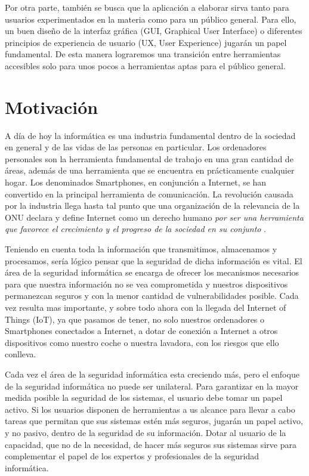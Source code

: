 Por otra parte, también se busca que la aplicación a elaborar sirva tanto para usuarios experimentados en la materia como para un público general. Para ello, un buen diseño de la interfaz gráfica (GUI, Graphical User Interface) o diferentes principios de experiencia de usuario (UX, User Experience) jugarán un papel fundamental. De esta manera lograremos una transición entre herramientas accesibles solo para unos pocos a herramientas aptas para el público general.

\section{Motivación}

A día de hoy la informática es una industria fundamental dentro de la sociedad en general y de las vidas de las personas en particular. Los ordenadores personales son la herramienta fundamental de trabajo en una gran cantidad de áreas, además de una herramienta que se encuentra en prácticamente cualquier hogar. Los denominados Smartphones, en conjunción a Internet, se han convertido en la principal herramienta de comunicación. La revolución causada por la industria llega hasta tal punto que una organización de la relevancia de la ONU declara y define Internet como un derecho humano \textit{por ser una herramienta que favorece el crecimiento y el progreso de la sociedad en su conjunto} \cite{onu-internet}.

Teniendo en cuenta toda la información que transmitimos, almacenamos y procesamos, sería lógico pensar que la seguridad de dicha información es vital. El área de la seguridad informática se encarga de ofrecer los mecanismos necesarios para que nuestra información no se vea comprometida y nuestros dispositivos permanezcan seguros y con la menor cantidad de vulnerabilidades posible. Cada vez resulta mas importante, y sobre todo ahora con la llegada del Internet of Things (IoT), ya que pasamos de tener, no solo nuestros ordenadores o Smartphones conectados a Internet, a dotar de conexión a Internet a otros dispositivos como nuestro coche o nuestra lavadora, con los riesgos que ello conlleva.

Cada vez el área de la seguridad informática esta creciendo más, pero el enfoque de la seguridad informática no puede ser unilateral. Para garantizar en la mayor medida posible la seguridad de los sistemas, el usuario debe tomar un papel activo. Si los usuarios disponen de herramientas a us alcance para llevar a cabo tareas que permitan que sus sistemas estén más seguros, jugarán un papel activo, y no pasivo, dentro de la seguridad de su información. Dotar al usuario de la capacidad, que no de la necesidad, de hacer más seguros sus sistemas sirve para complementar el papel de los expertos y profesionales de la seguridad informática.